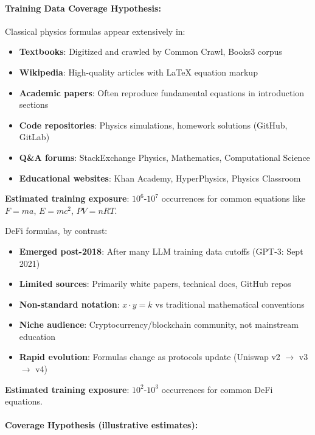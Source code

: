 \documentclass[twoside,11pt]{article}
\begin{document}
\paragraph{Training Data Coverage Hypothesis:}

Classical physics formulas appear extensively in:
\begin{itemize}
\item \textbf{Textbooks}: Digitized and crawled by Common Crawl, Books3 corpus
\item \textbf{Wikipedia}: High-quality articles with LaTeX equation markup
\item \textbf{Academic papers}: Often reproduce fundamental equations in introduction sections
\item \textbf{Code repositories}: Physics simulations, homework solutions (GitHub, GitLab)
\item \textbf{Q\&A forums}: StackExchange Physics, Mathematics, Computational Science
\item \textbf{Educational websites}: Khan Academy, HyperPhysics, Physics Classroom
\end{itemize}

\textbf{Estimated training exposure}: $10^6$-$10^7$ occurrences for common equations like $F = ma$, $E = mc^2$, $PV = nRT$.

DeFi formulas, by contrast:
\begin{itemize}
\item \textbf{Emerged post-2018}: After many LLM training data cutoffs (GPT-3: Sept 2021)\citep{kambhampati2024llms}
\item \textbf{Limited sources}: Primarily white papers, technical docs, GitHub repos
\item \textbf{Non-standard notation}: $x \cdot y = k$ vs traditional mathematical conventions
\item \textbf{Niche audience}: Cryptocurrency/blockchain community, not mainstream education
\item \textbf{Rapid evolution}: Formulas change as protocols update (Uniswap v2 $\to$ v3 $\to$ v4)
\end{itemize}

\textbf{Estimated training exposure}: $10^2$-$10^3$ occurrences for common DeFi equations.

\paragraph{Coverage Hypothesis (illustrative estimates):}
\end{document}
